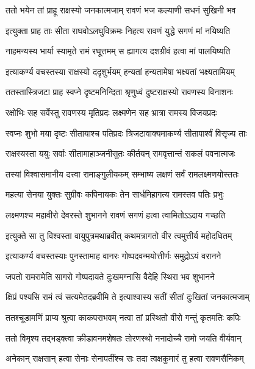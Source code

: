 \twolineshloka
{ततो भयेन तां प्राहू राक्षस्यो जनकात्मजाम्}
{रावणं भज कल्याणी सधनं सुखिनी भव} %

\twolineshloka
{इत्युक्ता प्राह ताः सीता राघवोऽलघुविक्रमः}
{निहत्य रावणं युद्धे सगणं मां नयिष्यति} %

\twolineshloka
{नाहमन्यस्य भार्या स्यामृते रामं रघूत्तमम्}
{स ह्यागत्य दशग्रीवं हत्वा मां पालयिष्यति} %

\twolineshloka
{इत्याकर्ण्य वचस्तस्या राक्षस्यो ददृशुर्भयम्}
{हन्यतां हन्यतामेषा भक्ष्यतां भक्ष्यतामियम्} %

\twolineshloka
{ततस्तास्त्रिजटा प्राह स्वप्ने दृष्टमनिन्दिता}
{श्रृणुध्वं दुष्टराक्षस्यो रावणस्य विनाशनः} %

\twolineshloka
{रक्षोभिः सह सर्वेस्तु रावणस्य मृतिप्रदः}
{लक्ष्मणेन सह भ्रात्रा रामस्य विजयप्रदः} %

\twolineshloka
{स्वप्नः शुभो मया दृष्टः सीतायाश्च पतिप्रदः}
{त्रिजटावाक्यमाकर्ण्य सीतापार्श्वं विसृज्य ताः} %

\twolineshloka
{राक्षस्यस्ता ययुः सर्वाः सीतामाहाञ्जनीसुतः}
{कीर्तयन् रामवृत्तान्तं सकलं पवनात्मजः} %

\twolineshloka
{तस्यां विश्वासमानीय दत्त्वा रामाङ्गुलीयकम्}
{सम्भाष्य लक्षणं सर्वं रामलक्ष्मणयोस्ततः} %

\twolineshloka
{महत्या सेनया युक्तः सुग्रीवः कपिनायकः}
{तेन सार्धमिहागत्य रामस्तव पतिः प्रभुः} %

\twolineshloka
{लक्ष्मणश्च महावीरो देवरस्ते शुभानने}
{रावणं सगणं हत्वा त्वामितोऽऽदाय गच्छति} %

\twolineshloka
{इत्युक्ते सा तु विश्वस्ता वायुपुत्रमथाब्रवीत्}
{कथमत्रागतो वीर त्वमुत्तीर्य महोदधितम्} %

\twolineshloka
{इत्याकर्ण्य वचस्तस्याः पुनस्तामाह वानरः}
{गोष्पदवन्मयोत्तीर्णः समुद्रोऽयं वरानने} %

\twolineshloka
{जपतो रामरामेति सागरो गोष्पदायते}
{दुःखमग्नासि वैदेहि स्थिरा भव शुभानने} %

\twolineshloka
{क्षिप्रं पश्यसि रामं त्वं सत्यमेतदब्रवीमि ते}
{इत्याश्वास्य सतीं सीतां दुःखितां जनकात्मजाम्} %

\twolineshloka
{ततश्चूडामणिं प्राप्य श्रुत्वा काकपराभवम्}
{नत्वा तां प्रस्थितो वीरो गन्तुं कृतमतिः कपिः} %

\twolineshloka
{ततो विमृश्य तद्भड्क्त्वा क्रीडावनमशेषतः}
{तोरणस्थो ननादोच्चै रामो जयति वीर्यवान्} %

\twolineshloka
{अनेकान् राक्षसान् हत्वा सेनाः सेनापतींश्च सः}
{तदा त्वक्षकुमारं तु हत्वा रावणसैनिकम्} %

